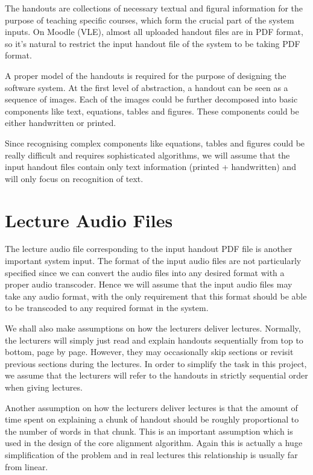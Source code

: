 The handouts are collections of necessary textual and figural information for the purpose of teaching specific courses, which form the crucial part of the system inputs. On Moodle (VLE), almost all uploaded handout files are in PDF format, so it's natural to restrict the input handout file of the system to be taking PDF format.

A proper model of the handouts is required for the purpose of designing the software system. At the first level of abstraction, a handout can be seen as a sequence of images. Each of the images could be further decomposed into basic components like text, equations, tables and figures. These components could be either handwritten or printed.

Since recognising complex components like equations, tables and figures could be really difficult and requires sophisticated algorithms, we will assume that the input handout files contain only text information (printed + handwritten) and will only focus on recognition of text.


\section{Lecture Audio Files}

The lecture audio file corresponding to the input handout PDF file is another important system input. The format of the input audio files are not particularly specified since we can convert the audio files into any desired format with a proper audio transcoder. Hence we will assume that the input audio files may take any audio format, with the only requirement that this format should be able to be transcoded to any required format in the system.

We shall also make assumptions on how the lecturers deliver lectures. Normally, the lecturers will simply just read and explain handouts sequentially from top to bottom, page by page. However, they may occasionally skip sections or revisit previous sections during the lectures. In order to simplify the task in this project, we assume that the lecturers will refer to the handouts in strictly sequential order when giving lectures.

Another assumption on how the lecturers deliver lectures is that the amount of time spent on explaining a chunk of handout should be roughly proportional to the number of words in that chunk. This is an important assumption which is used in the design of the core alignment algorithm. Again this is actually a huge simplification of the problem and in real lectures this relationship is usually far from linear. 


